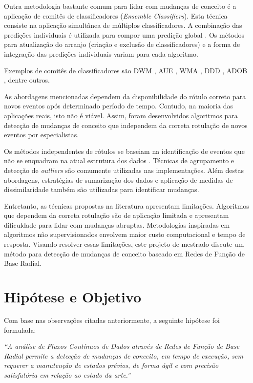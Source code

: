 \documentclass[qual, classic, a4paper]{ufbathesis}
\begin{document}
Outra metodologia bastante comum para lidar com mudanças de conceito é a aplicação de comitês de classificadores (\textit{Ensemble Classifiers}). 
Esta técnica consiste na aplicação simultânea de múltiplos classificadores.
A combinação das predições individuais é utilizada para compor uma predição global \cite{Gama:2014:SCD:2597757.2523813}.
Os métodos para atualização do arranjo (criação e exclusão de classificadores) e a forma de integração das predições individuais variam para cada algoritmo.

Exemplos de comitês de classificadores são 
DWM \cite{Kolter:2007:DWM:1314498.1390333}, AUE \cite{AUE}, 
WMA \cite{Blum1997}, DDD \cite{Minku:2012:DNE:2197077.2197204}, ADOB \cite{deCarvalhoSantos:2014:SUR:3120352.3120365}, dentre outros.

As abordagens mencionadas dependem da disponibilidade do rótulo correto para novos eventos após determinado período de tempo.
Contudo, na maioria das aplicações reais, isto não é viável. 
Assim, foram desenvolvidos algoritmos para detecção de mudanças de conceito que independem da correta rotulação de novos eventos por especialistas.

Os métodos independentes de rótulos se baseiam na identificação de eventos que não se enquadram na atual estrutura dos dados \cite{Spinosa:2007:OCA:1244002.1244107}.
Técnicas de agrupamento e detecção de \textit{outliers} são comumente utilizadas nas implementações.
Além destas abordagens, estratégias de sumarização dos dados e aplicação de medidas de dissimilaridade \cite{Ryu:Kantardzic:2012} também são utilizadas para identificar mudanças.

Entretanto, as técnicas propostas na literatura apresentam limitações.
Algoritmos que dependem da correta rotulação são de aplicação limitada e apresentam dificuldade para lidar com mudanças abruptas.
Metodologias inspiradas em algoritmos não supervisionados envolvem maior custo computacional e tempo de resposta.
Visando resolver essas limitações, este projeto de mestrado discute um método para detecção de mudanças de conceito baseado em Redes de Função de Base Radial.

\section{Hipótese e Objetivo}

Com base nas observações citadas anteriormente, a seguinte hipótese foi formulada:

\begin{center}
\textit{``A análise de Fluxos Contínuos de Dados através de Redes de Função de Base Radial permite a detecção de mudanças de conceito, 
em tempo de execução, sem requerer a manutenção de estados prévios, de forma ágil e com precisão satisfatória em relação ao estado da arte.''}
\end{center}
\end{document}
